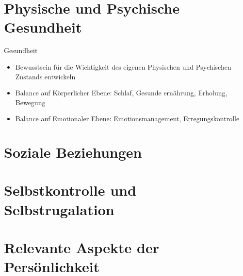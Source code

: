 \section{Physische und Psychische Gesundheit}

\begin{frame}[c]{Gesundheit}
    \begin{itemize}
    \item Bewusstsein für die Wichtigkeit des eigenen Physischen und Psychischen Zustands entwickeln
    \pause
    \item Balance auf Körperlicher Ebene: \pause Schlaf\pause, Gesunde ernährung\pause, Erholung\pause, Bewegung
    \pause
    \item Balance auf Emotionaler Ebene: \pause Emotionsmanagement\pause, Erregungskontrolle
    \end{itemize}
\end{frame}



\section{Soziale Beziehungen}

\begin{frame}[c]
    
\end{frame}



\section{Selbstkontrolle und Selbstrugalation}




\section{Relevante Aspekte der Persönlichkeit}



























